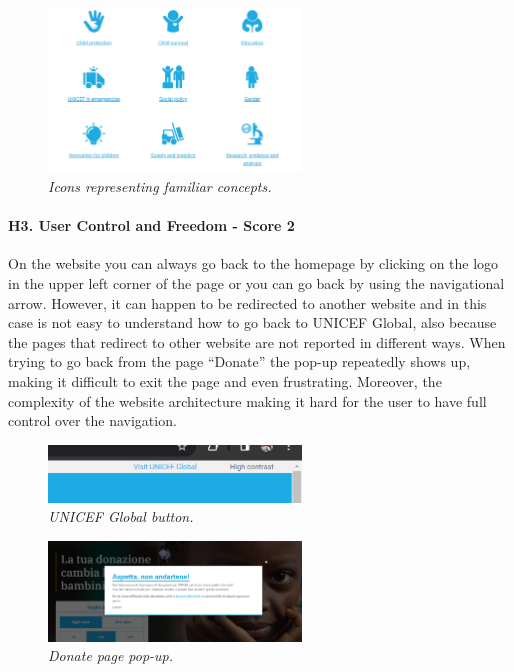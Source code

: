 \begin{figure}[h]
	\centering
	\begin{center}
		\includegraphics[width=0.6\textwidth]{Picture3.png}
	\end{center}
	\captionsetup{font=small}
	\caption{\textit{Icons representing familiar concepts.}}
	\label{fig:label3}
\end{figure}

\paragraph*{H3. User Control and Freedom - Score 2}
On the website you can always go back to the homepage by clicking on the logo in the upper left corner of the page or you can go back by using the navigational arrow. However, it can happen to be redirected to another website and in this case is not easy to understand how to go back to UNICEF Global, also because the pages that redirect to other website are not reported in different ways. When trying to go back from the page “Donate” the pop-up repeatedly shows up, making it difficult to exit the page and even frustrating. Moreover, the complexity of the website architecture making it hard for the user to have full control over the navigation.

\begin{figure}[h]
	\centering
	\begin{center}
		\includegraphics[width=0.6\textwidth]{Picture4.png}
	\end{center}
	\captionsetup{font=small}
	\caption{\textit{UNICEF Global button.}}
	\label{fig:label4}
\end{figure}

\begin{figure}[h]
	\centering
	\begin{center}
		\includegraphics[width=0.6\textwidth]{Picture5.png}
	\end{center}
	\captionsetup{font=small}
	\caption{\textit{Donate page pop-up.}}
	\label{fig:label5}
\end{figure}

